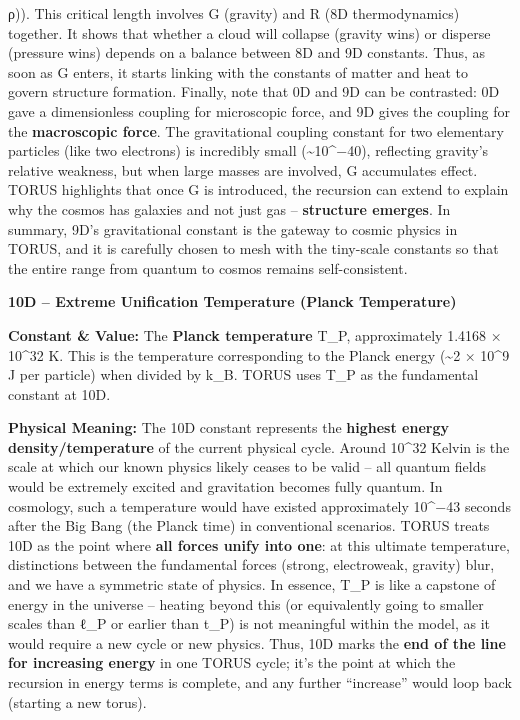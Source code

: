 \documentclass[
]{article}
\begin{document}
ρ)). This critical length involves G (gravity) and R (8D thermodynamics)
together\hspace{0pt}. It shows that whether a cloud will collapse
(gravity wins) or disperse (pressure wins) depends on a balance between
8D and 9D constants. Thus, as soon as G enters, it starts linking with
the constants of matter and heat to govern structure formation. Finally,
note that 0D and 9D can be contrasted: 0D gave a dimensionless coupling
for microscopic force, and 9D gives the coupling for the
\textbf{macroscopic force}. The gravitational coupling constant for two
elementary particles (like two electrons) is incredibly small
(\textasciitilde10\^{}−40), reflecting gravity's relative weakness, but
when large masses are involved, G accumulates effect. TORUS highlights
that once G is introduced, the recursion can extend to explain why the
cosmos has galaxies and not just gas -- \textbf{structure emerges}. In
summary, 9D's gravitational constant is the gateway to cosmic physics in
TORUS, and it is carefully chosen to mesh with the tiny-scale constants
so that the entire range from quantum to cosmos remains self-consistent.

\textbf{10D -- Extreme Unification Temperature (Planck Temperature)}

\textbf{Constant \& Value:} The \textbf{Planck temperature} T\_P,
approximately 1.4168 × 10\^{}32 K\hspace{0pt}. This is the temperature
corresponding to the Planck energy (\textasciitilde2 × 10\^{}9 J per
particle) when divided by k\_B. TORUS uses T\_P as the fundamental
constant at 10D.

\textbf{Physical Meaning:} The 10D constant represents the
\textbf{highest energy density/temperature} of the current physical
cycle. Around 10\^{}32 Kelvin is the scale at which our known physics
likely ceases to be valid -- all quantum fields would be extremely
excited and gravitation becomes fully quantum. In cosmology, such a
temperature would have existed approximately 10\^{}−43 seconds after the
Big Bang (the Planck time) in conventional scenarios. TORUS treats 10D
as the point where \textbf{all forces unify into one}: at this ultimate
temperature, distinctions between the fundamental forces (strong,
electroweak, gravity) blur, and we have a symmetric state of
physics\hspace{0pt}. In essence, T\_P is like a capstone of energy in
the universe -- heating beyond this (or equivalently going to smaller
scales than ℓ\_P or earlier than t\_P) is not meaningful within the
model, as it would require a new cycle or new physics. Thus, 10D marks
the \textbf{end of the line for increasing energy} in one TORUS cycle;
it's the point at which the recursion in energy terms is complete, and
any further ``increase'' would loop back (starting a new torus).
\end{document}
